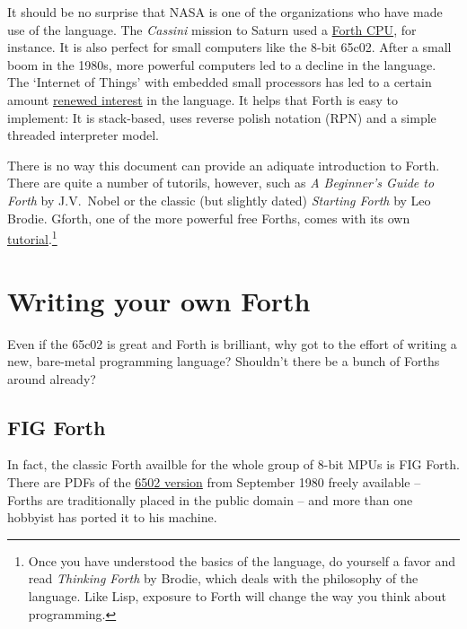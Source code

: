 It should be no surprise that NASA is one of the organizations who
have made use of the language. The \textit{Cassini}
mission to Saturn used a
\href{http://www.cpushack.com/2013/02/21/charles-moore-forth-stack-processors/}{Forth
CPU}, for instance. It is also perfect for small computers like the 8-bit 65c02.
After a small boom in the 1980s, more powerful computers led to a decline in the
language. The `Internet of Things' with embedded small processors has led to a
certain amount
\href{https://www.embedded.com/design/programming-languages-and-tools/4431133/Go-Forth-}{renewed
interest} in the language. It helps that Forth is easy to implement: It is
stack-based, uses reverse polish notation (RPN) and a simple threaded interpreter
model. 

There is no way this document can provide an adiquate introduction to Forth.
There are quite a number of tutorils, however, such as \textit{A Beginner's
Guide to Forth} by J.V.~Nobel\cite{nobel} or the classic (but slightly dated)
\textit{Starting Forth}\cite{brodie03} by Leo Brodie.
Gforth, one of the more powerful free Forths, comes with its own
\href{http://www.complang.tuwien.ac.at/forth/gforth/Docs-html/Tutorial.html}{tutorial}.\footnote{Once
you have understood the basics of the language, do yourself a favor and read
\textit{Thinking Forth} by Brodie\cite{brodie84}, which
deals with the philosophy of the language. Like Lisp, exposure to
Forth will change the way you think about programming.} 


\section{Writing your own Forth}

Even if the 65c02 is great and Forth is brilliant, why got to the effort of
writing a new, bare-metal programming language? Shouldn't there be a bunch of
Forths around already?


\subsection{FIG Forth}

In fact, the classic Forth availble for the whole group of 8-bit MPUs is FIG
Forth. There are PDFs of the
\href{http://www.forth.org/fig-forth/fig-forth\_6502.pdf}{6502 version} from
September 1980 freely available -- Forths are traditionally placed in the public
domain -- and more than one hobbyist has ported it to his machine. 

